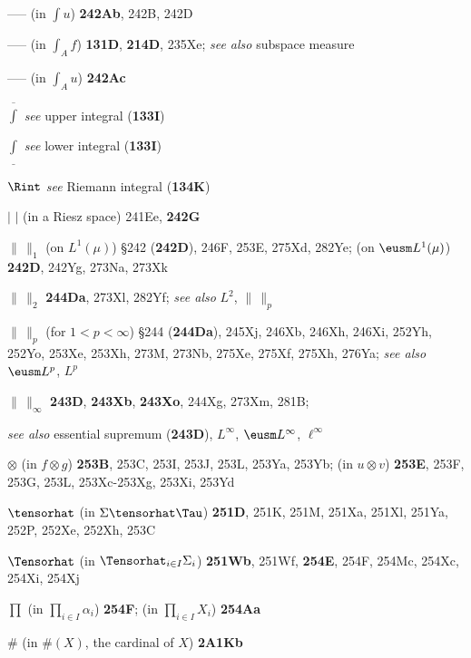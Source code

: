 -----  (in $\int u$) {\bf 242Ab}, 242B, 242D


----- (in $\int_Af$) {\bf 131D}, {\bf 214D}, 235Xe;  
  {\it see also} subspace measure

----- (in $\int_Au$) {\bf 242Ac}


$\overline{\int}$ {\it see} upper integral ({\bf 133I})

$\underline{\int}$ {\it see} lower integral ({\bf 133I})





$\Rint$ {\it see} Riemann integral ({\bf 134K})



$|\,\,|$ (in a Riesz space) 241Ee, {\bf 242G}




$\|\,\|_1$ (on $L^1(\mu)$) \S242 ({\bf 242D}), 246F, 253E, 275Xd,
282Ye;
  (on $\eusm L^1(\mu)$) {\bf 242D}, 242Yg, 273Na, 273Xk


$\|\,\|_2$ {\bf 244Da}, 273Xl, 282Yf;
  {\it see also} $L^2$, $\|\,\|_p$


$\|\,\|_p$ (for $1<p<\infty$) \S244 ({\bf 244Da}), 245Xj, 246Xb,
246Xh, 246Xi, 252Yh, 252Yo, 253Xe, 253Xh,
273M, 273Nb, 275Xe, 275Xf, 275Xh, 276Ya;
  {\it see also} $\eusm L^p$, $L^p$




$\|\,\|_{\infty}$ {\bf 243D}, {\bf 243Xb}, {\bf 243Xo}, 244Xg,
273Xm, 281B;

  {\it see also} essential supremum ({\bf 243D}), $L^{\infty}$, $\eusm L^{\infty}$,
$\ell^{\infty}$








$\otimes$ (in $f\otimes g$) {\bf 253B}, 253C, 253I, 253J, 253L,
253Ya, 253Yb;
  (in $u\otimes v$) {\bf 253E}, 253F, 253G, 253L,
253Xc-253Xg, 
253Xi, 253Yd




$\tensorhat$ (in $\Sigma\tensorhat\Tau$) {\bf 251D}, 251K, 251M,
251Xa, 251Xl, 251Ya, 252P, 252Xe, 252Xh, 253C


$\Tensorhat$ (in $\Tensorhat_{i\in I}\Sigma_i$) {\bf 251Wb}, 251Wf,
{\bf 254E}, 254F, 254Mc, 254Xc, 254Xi, 254Xj



$\prod$ (in $\prod_{i\in I}\alpha_i$) {\bf 254F};
  (in $\prod_{i\in I}X_i$) {\bf 254Aa}


$\#$ (in $\#(X)$, the cardinal of $X$) {\bf 2A1Kb}






